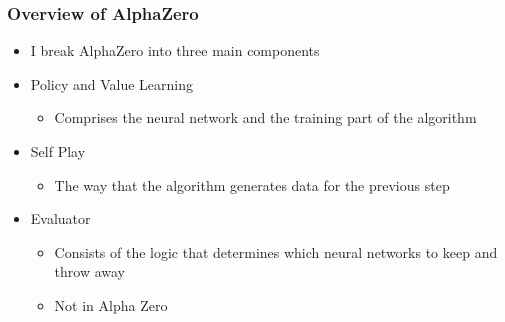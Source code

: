 \documentclass{beamer}
\begin{document}


\begin{frame}
  \frametitle{Overview of AlphaZero}

  \begin{itemize}
    \item I break AlphaZero into three main components
    \item Policy and Value Learning
      \begin{itemize}
        \item Comprises the neural network and the training part of the algorithm
      \end{itemize}
    \item Self Play
      \begin{itemize}
        \item The way that the algorithm generates data for the previous step
      \end{itemize}
    \item Evaluator
      \begin{itemize}
        \item Consists of the logic that determines which neural networks to keep and throw away
        \item Not in Alpha Zero
      \end{itemize}
  \end{itemize}
\end{frame}


\end{document}
